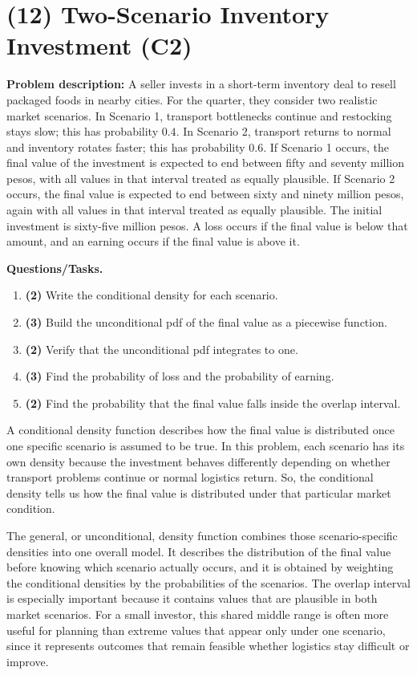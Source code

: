 \section{(12) Two-Scenario Inventory Investment (C2)}

\textbf{Problem description:}
A seller invests in a short-term inventory deal to resell packaged foods in nearby cities. For the quarter, they consider two realistic market scenarios. In Scenario 1, transport bottlenecks continue and restocking stays slow; this has probability $0.4$. In Scenario 2, transport returns to normal and inventory rotates faster; this has probability $0.6$. If Scenario 1 occurs, the final value of the investment is expected to end between fifty and seventy million pesos, with all values in that interval treated as equally plausible. If Scenario 2 occurs, the final value is expected to end between sixty and ninety million pesos, again with all values in that interval treated as equally plausible. The initial investment is sixty-five million pesos. A loss occurs if the final value is below that amount, and an earning occurs if the final value is above it.

\textbf{Questions/Tasks.}
\begin{enumerate}[label=\textbf{\alph*)}]
	\item \textbf{(2)} Write the conditional density for each scenario.
	\item \textbf{(3)} Build the unconditional pdf of the final value as a piecewise function.
	\item \textbf{(2)} Verify that the unconditional pdf integrates to one.
	\item \textbf{(3)} Find the probability of loss and the probability of earning.
	\item \textbf{(2)} Find the probability that the final value falls inside the overlap interval.
\end{enumerate}

A conditional density function describes how the final value is distributed once one specific scenario is assumed to be true. In this problem, each scenario has its own density because the investment behaves differently depending on whether transport problems continue or normal logistics return. So, the conditional density tells us how the final value is distributed under that particular market condition.

The general, or unconditional, density function combines those scenario-specific densities into one overall model. It describes the distribution of the final value before knowing which scenario actually occurs, and it is obtained by weighting the conditional densities by the probabilities of the scenarios. The overlap interval is especially important because it contains values that are plausible in both market scenarios. For a small investor, this shared middle range is often more useful for planning than extreme values that appear only under one scenario, since it represents outcomes that remain feasible whether logistics stay difficult or improve.

